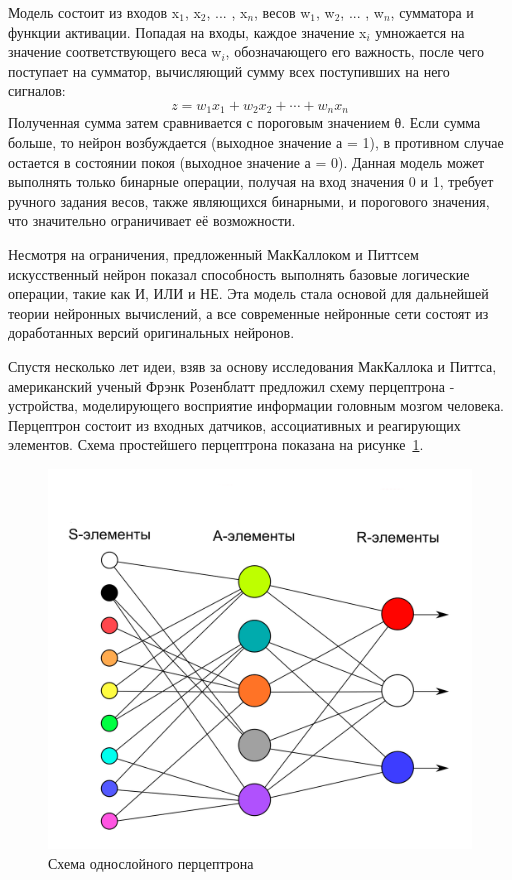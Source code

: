 Модель состоит из входов x$_{1}$, x$_{2}$, ... , x$_{n}$, весов w$_{1}$, w$_{2}$, ... , w$_{n}$, сумматора и функции активации. Попадая на входы, каждое значение x$_{i}$ умножается на значение соответствующего веса w$_{i}$, обозначающего его важность, после чего поступает на сумматор, вычисляющий сумму всех поступивших на него сигналов:
\[
z = w_1 x_1 + w_2 x_2 + \cdots + w_n x_n
\]
Полученная сумма затем сравнивается с пороговым значением θ. Если сумма больше, то нейрон возбуждается (выходное значение а = 1), в противном случае остается в состоянии покоя (выходное значение а = 0). Данная модель может выполнять только бинарные операции, получая на вход значения 0 и 1, требует ручного задания весов, также являющихся бинарными, и порогового значения, что значительно ограничивает её возможности. 

Несмотря на ограничения, предложенный МакКаллоком и Питтсем искусственный нейрон показал способность выполнять базовые логические операции, такие как И, ИЛИ и НЕ. Эта модель стала основой для дальнейшей теории нейронных вычислений, а все современные нейронные сети состоят из доработанных версий оригинальных нейронов. 

 Спустя несколько лет идеи, взяв за основу исследования МакКаллока и Питтса, американский ученый Фрэнк Розенблатт предложил схему перцептрона - устройства, моделирующего восприятие информации головным мозгом человека. Перцептрон состоит из входных датчиков, ассоциативных и реагирующих элементов\cite{perceptron}. Схема простейшего перцептрона показана на рисунке~\ref{fig:simpleperceptron}.
 
\begin{figure}[h]
	\centering
	\includegraphics[width=0.7\linewidth]{images/Simple_perceptron}
	\caption{Схема однослойного перцептрона}
	\label{fig:simpleperceptron}
\end{figure}
 
